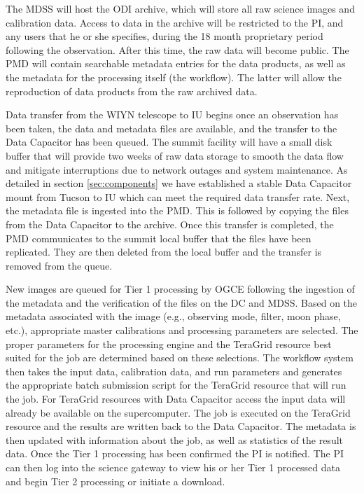 \documentclass[10pt,conference]{IEEEtran}
\begin{document}
The MDSS will host the ODI archive, which will store all raw science images and calibration data.
Access to data in the archive will be restricted to the PI, and any users that he or she specifies, during the 18 month proprietary period following the observation. After this time, the raw data will become public. The PMD will contain searchable metadata entries for the data products, as well as the metadata for the processing itself (the workflow). The latter will allow the reproduction of data products from the raw archived data. 

Data transfer from the WIYN telescope to IU begins once an observation has been taken, the data and metadata files are available, and the transfer to the Data Capacitor has been queued. 
The summit facility will have a small disk buffer that will provide two weeks of raw data storage to smooth the data flow and mitigate interruptions due to network outages and system maintenance. As detailed in section \ref{sec:components} we have established a stable Data Capacitor mount from Tucson to IU which can meet the required data transfer rate. Next, the metadata file is ingested into the PMD. This is followed by copying the files from the Data Capacitor to the archive. Once this transfer is completed, the PMD communicates to the summit local buffer that the files have been replicated. They are then deleted from the local buffer and the transfer is removed from the queue.

New images are queued for Tier 1 processing by OGCE following the ingestion of the metadata and the verification of the files on the DC and MDSS. 
Based on the metadata associated with the image (e.g., observing mode, filter, moon phase, etc.), appropriate master calibrations and processing parameters are selected. The proper parameters for the processing engine and the TeraGrid resource best suited for the job are determined based on these selections. The workflow system then takes the input data, calibration data, and run parameters and generates the appropriate batch submission script for the TeraGrid resource that will run the job. For TeraGrid resources with Data Capacitor access the input data will already be available on the supercomputer. The job is executed on the TeraGrid resource and the results are written back to the Data Capacitor. The metadata is then updated with information about the job, as well as statistics of the result data. Once the Tier 1 processing has been confirmed the PI is notified. The PI can then log into the science gateway to view his or her Tier 1 processed data and begin Tier 2 processing or initiate a download.
\end{document}
